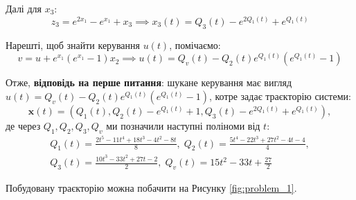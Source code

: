 \documentclass[oneside,solution]{karazin-control-assign}
\begin{document}
Далі для $x_3$:
\begin{equation}
    z_3 = e^{2x_1} - e^{x_1} + x_3 \implies x_3(t) = Q_3(t) - e^{2Q_1(t)} + e^{Q_1(t)}
\end{equation}

Нарешті, щоб знайти керування $u(t)$, помічаємо:
\begin{equation}
    v = u + e^{x_1}(e^{x_1}-1)x_2 \implies u(t) = Q_v(t) - Q_2(t)e^{Q_1(t)}(e^{Q_1(t)}-1)
\end{equation}

Отже, \textbf{відповідь на перше питання}: шукане керування має вигляд $u(t) = Q_v(t) - Q_2(t)e^{Q_1(t)}(e^{Q_1(t)}-1)$, котре задає траєкторію системи:
\begin{equation}
    \mathbf{x}(t) = (Q_1(t), Q_2(t) - e^{Q_1(t)}+1, Q_3(t) - e^{2Q_1(t)}+e^{Q_1(t)}),
\end{equation}
де через $Q_1,Q_2,Q_3,Q_v$ ми позначили наступні поліноми від $t$:
\begin{gather}
    Q_1(t) = \frac{2t^5-11t^4+18t^3-4t^2-8t}{8}, \; Q_2(t) = \frac{5t^4-22t^3+27t^2-4t-4}{4}, \nonumber \\ Q_3(t) = \frac{10t^3-33t^2+27t-2}{2}, \; Q_v(t) = 15t^2 - 33t + \frac{27}{2}
\end{gather}

Побудовану траєкторію можна побачити на Рисунку \ref{fig:problem_1}.
\end{document}

